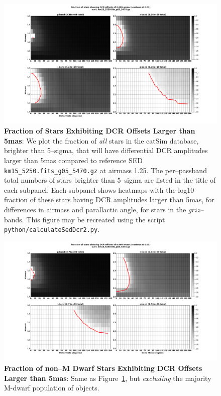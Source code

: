 \documentclass[DM,toc]{lsstdoc}
\begin{document}
\begin{figure}[!t]
  \centering
  \includegraphics[width=1.1\textwidth]{calculateSedDcr2.png}
  \caption{{\bf Fraction of Stars Exhibiting DCR Offsets Larger than
      5mas}: We plot the fraction of {\it all} stars in the catSim
    database, brighter than 5--sigma, that will have differential DCR
    amplitudes larger than 5mas compared to reference SED {\tt
      km15\_5250.fits\_g05\_5470.gz} at airmass 1.25.  The
    per--passband total numbers of stars brighter than 5--sigma are
    listed in the title of each subpanel.  Each subpanel shows
    heatmaps with the log10 fraction of these stars having DCR
    amplitudes larger than 5mas, for differences in airmass and
    parallactic angle, for stars in the $griz$--bands.  This figure
    may be recreated using the script {\tt
      python/calculateSedDcr2.py}.}
  \label{fig:dcr}
\end{figure}

\begin{figure}[!t]
  \centering
  \includegraphics[width=1.1\textwidth]{calculateSedDcr2M.png}
  \caption{{\bf Fraction of non--M Dwarf Stars Exhibiting DCR Offsets
      Larger than 5mas}: Same as Figure~\ref{fig:dcr}, but {\it
      excluding} the majority M-dwarf population of objects.}
  \label{fig:dcrnoM}
\end{figure}
\end{document}
